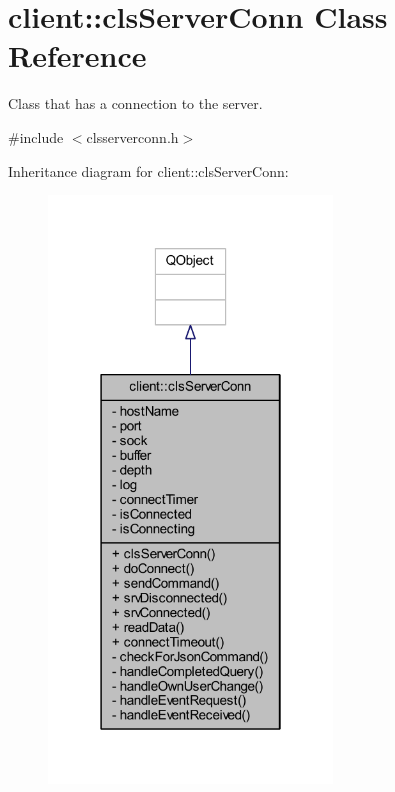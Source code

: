 \hypertarget{classclient_1_1cls_server_conn}{\section{client\-:\-:cls\-Server\-Conn Class Reference}
\label{d3/d65/classclient_1_1cls_server_conn}
}


Class that has a connection to the server.  




{\ttfamily \#include $<$clsserverconn.\-h$>$}



Inheritance diagram for client\-:\-:cls\-Server\-Conn\-:\nopagebreak
\begin{figure}[H]
\begin{center}
\leavevmode
\includegraphics[width=214pt]{d9/d0c/classclient_1_1cls_server_conn__inherit__graph}
\end{center}
\end{figure}



